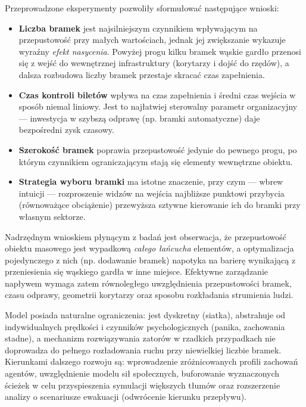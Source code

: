 \documentclass[polish]{projectreport}
\begin{document}
Przeprowadzone eksperymenty pozwoliły sformułować następujące wnioski:
\begin{itemize}
    \item \textbf{Liczba bramek} jest najsilniejszym czynnikiem wpływającym na przepustowość przy małych wartościach, jednak jej zwiększanie wykazuje wyraźny \emph{efekt nasycenia}. Powyżej progu kilku bramek wąskie gardło przenosi się z wejść do wewnętrznej infrastruktury (korytarzy i dojść do rzędów), a dalsza rozbudowa liczby bramek przestaje skracać czas zapełnienia.
    \item \textbf{Czas kontroli biletów} wpływa na czas zapełnienia i średni czas wejścia w sposób niemal liniowy. Jest to najłatwiej sterowalny parametr organizacyjny --- inwestycja w szybszą odprawę (np. bramki automatyczne) daje bezpośredni zysk czasowy.
    \item \textbf{Szerokość bramek} poprawia przepustowość jedynie do pewnego progu, po którym czynnikiem ograniczającym stają się elementy wewnętrzne obiektu.
    \item \textbf{Strategia wyboru bramki} ma istotne znaczenie, przy czym --- wbrew intuicji --- rozproszenie widzów na wejścia najbliższe punktowi przybycia (równoważące obciążenie) przewyższa sztywne kierowanie ich do bramki przy własnym sektorze.
\end{itemize}

Nadrzędnym wnioskiem płynącym z badań jest obserwacja, że przepustowość obiektu masowego jest wypadkową \emph{całego łańcucha} elementów, a optymalizacja pojedynczego z nich (np. dodawanie bramek) napotyka na barierę wynikającą z przeniesienia się wąskiego gardła w inne miejsce. Efektywne zarządzanie napływem wymaga zatem równoległego uwzględnienia przepustowości bramek, czasu odprawy, geometrii korytarzy oraz sposobu rozkładania strumienia ludzi.

Model posiada naturalne ograniczenia: jest dyskretny (siatka), abstrahuje od indywidualnych prędkości i czynników psychologicznych (panika, zachowania stadne), a mechanizm rozwiązywania zatorów w rzadkich przypadkach nie doprowadza do pełnego rozładowania ruchu przy niewielkiej liczbie bramek. Kierunkami dalszego rozwoju są: wprowadzenie zróżnicowanych profili zachowań agentów, uwzględnienie modelu sił społecznych, buforowanie wyznaczonych ścieżek w celu przyspieszenia symulacji większych tłumów oraz rozszerzenie analizy o scenariusze ewakuacji (odwrócenie kierunku przepływu).



\printbibliography
\end{document}
